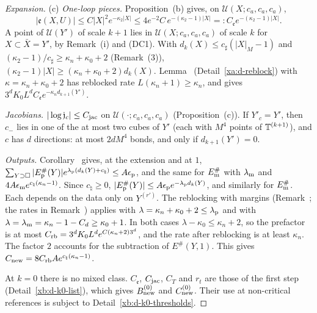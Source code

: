\begin{proof}[Expansion]
(c) \emph{One-loop pieces.} Proposition~(b) gives, on $\mathcal U(X;c_a,c_a,c_a)$,
\[
|\mathfrak e(X,U)|\le C|X|^2e^{-\kappa_2|X|}\le 4e^{-2}C\,e^{-(\kappa_2-1)|X|}=:C_{\mathfrak e}e^{-(\kappa_2-1)|X|}.
\]
 A point of $\mathcal U(Y')$ of scale $k+1$ lies in $\mathcal U(X;c_a,c_a,c_a)$ of scale $k$ for $X\subset\bar X=Y'$, by Remark~(i) and (DC1). With $d_k(X)\le c_\sharp(|X|_M-1)$ and $(\kappa_2-1)/c_\sharp\ge\kappa_n+\kappa_0+2$ (Remark~(3)), $(\kappa_2-1)|X|\ge(\kappa_n+\kappa_0+2)d_k(X)$. Lemma~ (Detail~\ref{xa:d-reblock}) with $\kappa=\kappa_n+\kappa_0+2$ has reblocked rate $L(\kappa_n+1)\ge\kappa_n$, and gives $3^dK_0L^dC_{\mathfrak e}e^{-\kappa_nd_{k+1}(Y')}$.

\emph{Jacobians.} $|\log\mathfrak j_c|\le C_{\rm jac}$ on $\mathcal U(\cdot;c_a,c_a,c_a)$ (Proposition~(c)). If $Y'_c=Y'$, then $c_-$ lies in one of the at most two cubes of $Y'$ (each with $M^4$ points of $\mathbb T^{(k+1)}$), and $c$ has $d$ directions: at most $2dM^4$ bonds, and only if $d_{k+1}(Y')=0$.

\emph{Outputs.} Corollary~ gives, at the extension and at $1$, $\sum_{Y\supset\Box}|E^\#_{\rm p}(Y)|e^{\lambda_{\rm p}(d_k(Y)+c_\natural)}\le A\epsilon_{\rm p}$, and the same for $E^\#_{\rm m}$ with $\lambda_{\rm m}$ and $4A\epsilon_{\rm m}e^{c_\natural(\kappa_n-1)}$. Since $c_\natural\ge0$, $|E^\#_{\rm p}(Y)|\le A\epsilon_{\rm p}e^{-\lambda_{\rm p}d_k(Y)}$, and similarly for $E^\#_{\rm m}$. Each depends on the data only on $Y^{(r')}$. The reblocking with margins (Remark~; the rates in Remark~) applies with $\lambda=\kappa_n+\kappa_0+2\le\lambda_{\rm p}$ and with $\lambda=\lambda_{\rm m}=\kappa_n-1-C_d\ge\kappa_0+1$. In both cases $\lambda-\kappa_0\le\kappa_n+2$, so the prefactor is at most $C_{\rm rb}=3^dK_0L^de^{C(\kappa_n+2)3^d}$, and the rate after reblocking is at least $\kappa_n$. The factor $2$ accounts for the subtraction of $E^\#(Y,1)$. This gives $C_{\rm new}=8C_{\rm rb}Ae^{c_\natural(\kappa_n-1)}$.

At $k=0$ there is no mixed class. $C_{\mathfrak e}$, $C_{\rm jac}$, $C_T$ and $r_t$ are those of the first step (Detail~\ref{xb:d-k0-list}), which gives $B^{(0)}_{\rm new}$ and $C^{(0)}_{\rm new}$. Their use at non-critical references is subject to Detail~\ref{xb:d-k0-thresholds}.
\end{proof}

